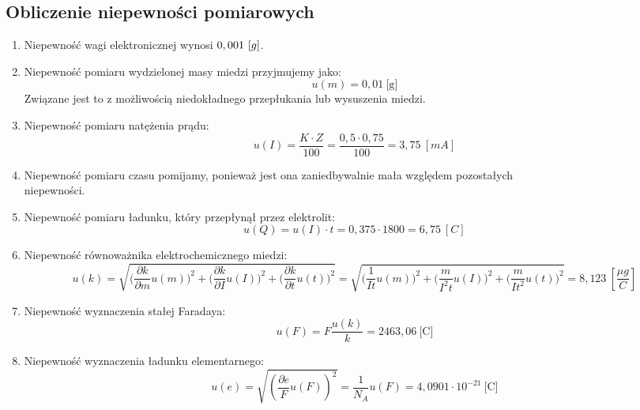 \documentclass{article}
\begin{document}
\subsection{Obliczenie niepewności pomiarowych}
\begin{enumerate}
	\item Niepewność wagi elektronicznej wynosi $ 0,001\ \mbox[g] $.
	\item Niepewność pomiaru wydzielonej masy miedzi przyjmujemy jako:
$$ u(m) = 0,01\ \mbox{[g]}$$
Związane jest to z możliwością niedokładnego przepłukania lub wysuszenia miedzi.
	\item Niepewność pomiaru natężenia prądu:
$$ u(I) = \frac{K \cdot Z}{100} = \frac{0,5 \cdot 0,75}{100} = 3,75\ {[mA]}$$
	\item Niepewność pomiaru czasu pomijamy, ponieważ jest ona zaniedbywalnie mała względem pozostałych \\niepewności.

	\item Niepewność pomiaru ładunku, który przepłynął przez elektrolit:
$$u(Q) = u(I)\cdot t = 0,375 \cdot 1800 = 6,75\ [C] $$
	\item Niepewność równoważnika elektrochemicznego miedzi:
	\begin{equation*}
		u(k) = \sqrt{\bigg(\frac{\partial k}{\partial m}u(m)\bigg)^2+\bigg(\frac{\partial k}{\partial I}u(I)\bigg)^2+\bigg(\frac{\partial k}{\partial t}u(t)\bigg)^2} =	\sqrt{\bigg(\frac{1}{It}u(m)\bigg)^2+\bigg(\frac{m}{I^{2}t}u(I)\bigg)^2+\bigg(\frac{m}{It^{2}}u(t)\bigg)^2} = 8,123 \ \left [\frac{ \mu g }{C} \right ]
	\end{equation*}
	\item Niepewność wyznaczenia stałej Faradaya:
$$u(F)=F \frac{u(k)}{k} = 2463,06\ \mbox{[C]}$$
	\item Niepewność wyznaczenia ładunku elementarnego:
$$u(e) = \sqrt{(\frac{\partial e}{F}u(F))^2} = \frac{1}{N_{A}}u(F) = 4,0901 \cdot 10^{-21}\ \mbox{[C]} $$
\end{enumerate}
\end{document}

